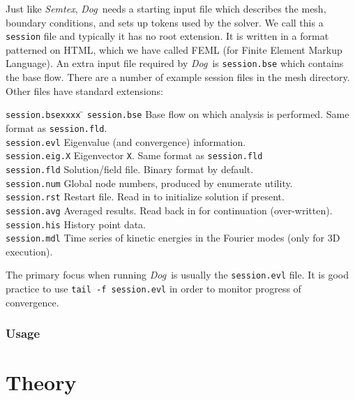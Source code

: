 \documentclass[11pt,a4paper]{report}
\newcommand{\Semtex}{\emph{Semtex}}
\newcommand{\Dog}{\emph{Dog}}
\begin{document}
Just like \Semtex, \Dog\ needs a starting input file which describes
the mesh, boundary conditions, and sets up tokens used by the solver.
We call this a \verb+session+ file and typically it has no root
extension.  It is written in a format patterned on HTML, which we
have called FEML (for Finite Element Markup Language). An extra input
file required by \Dog\ is \verb+session.bse+ which contains the base
flow. There are a number of example session files in the mesh
directory.  Other files have standard extensions:
\begin{tabbing}
\texttt{session.bsexxxx} \= \kill 
%
\texttt{session.bse}  \>
        Base flow on which analysis is performed.  Same format as
        \texttt{session.fld}.\\
\texttt{session.evl} \> Eigenvalue (and convergence) information.\\
\texttt{session.eig.X} \> Eigenvector \texttt{X}. 
     Same format as \texttt{session.fld}\\
\texttt{session.fld}  \>
        Solution/field file.  Binary format by default.\\
\texttt{session.num}  \>
        Global node numbers, produced by enumerate utility.\\
\texttt{session.rst}  \>
        Restart file. Read in to initialize solution if present.\\
\texttt{session.avg} \> Averaged results. Read back in for
        continuation (over-written).\\
\texttt{session.his} \> History point data.\\
\texttt{session.mdl} \> Time series of kinetic energies in the Fourier
        modes (only for 3D execution).\\
\end{tabbing}
The primary focus when running \Dog\ is usually the \verb+session.evl+
file. It is good practice to use \verb+tail -f session.evl+ in order
to monitor progress of convergence.


\subsection{Usage}


\chapter{Theory}
\label{ch.theory}
\end{document}
